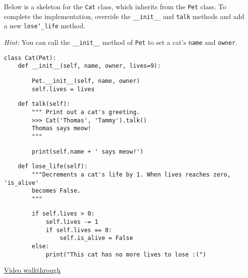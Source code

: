 \question Below is a skeleton for the \texttt{Cat} class, which inherits from
the \texttt{Pet} class. To complete the implementation, override the
\texttt{\_\_init\_\_} and \texttt{talk} methods and add a new
\texttt{lose\char`_life} method.

\textit{Hint:} You can call the \texttt{\_\_init\_\_} method of \texttt{Pet} to
set a cat's \texttt{name} and \texttt{owner}.

\begin{lstlisting}
class Cat(Pet):
    def __init__(self, name, owner, lives=9):
        \end{lstlisting}

        \begin{solution}[.3in]
        \begin{lstlisting}
        Pet.__init__(self, name, owner)
        self.lives = lives
        \end{lstlisting}
        \end{solution}

        \begin{lstlisting}
    def talk(self):
        """ Print out a cat's greeting.
        >>> Cat('Thomas', 'Tammy').talk()
        Thomas says meow!
        """
        \end{lstlisting}

        \begin{solution}[.3in]
        \begin{lstlisting}
        print(self.name + ' says meow!')
        \end{lstlisting}
        \end{solution}

        \begin{lstlisting}
    def lose_life(self):
        """Decrements a cat's life by 1. When lives reaches zero, 'is_alive'
        becomes False.
        """
        \end{lstlisting}

        \begin{solution}[.3in]
        \begin{lstlisting}
        if self.lives > 0:
            self.lives -= 1
            if self.lives == 0:
                self.is_alive = False
        else:
            print("This cat has no more lives to lose :(")
        \end{lstlisting}
        \end{solution}
\begin{solution}
\href{https://www.youtube.com/watch?v=BatqjYa7WZ8&list=PLx38hZJ5RLZfel-Gi9pjaUbfQDCZIsWMU&vq=hd1080&t=34m50s}{Video walkthrough}
\end{solution}
